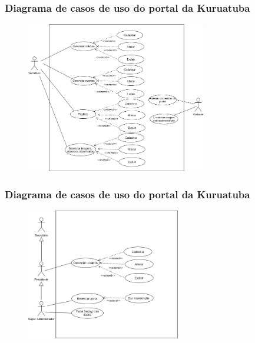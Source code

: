 \documentclass[xcolor=table]{beamer}
\begin{document}
\begin{frame}
    \frametitle{Diagrama de casos de uso do portal da Kuruatuba}
    \begin{figure}[htb]
        \centering
        
        \includegraphics[width=0.7\textwidth]{figuras/use-case-portal-1.png}
        
        \label{use-case-portal}
    \end{figure}
\end{frame}

\begin{frame}
    \frametitle{Diagrama de casos de uso do portal da Kuruatuba}
    \begin{figure}[htb]
        \centering
        
        \includegraphics[width=0.6\textwidth]{figuras/use-case-portal-2.png}
        
        \label{use-case-portal}
    \end{figure}
\end{frame}
\end{document}
